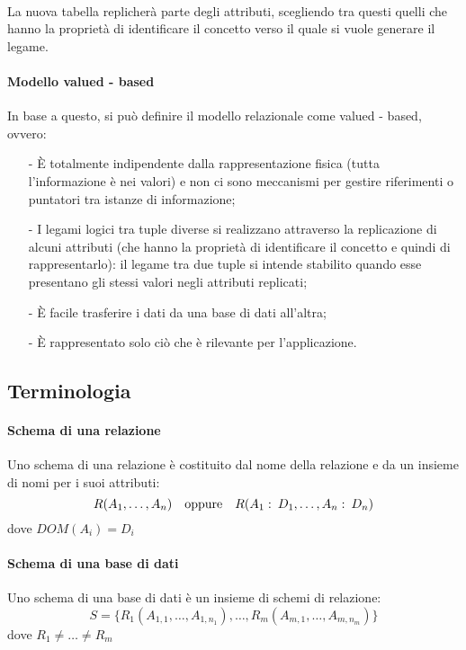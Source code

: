 \documentclass[a4paper, 10pt]{report}
\begin{document}
\noindent \\La nuova tabella replicherà
			parte degli attributi, scegliendo tra questi quelli che
			hanno la proprietà di identificare il concetto verso il
			quale si vuole generare il legame.
			
			
\paragraph*{Modello valued - based} In base a questo, si può definire il modello relazionale come valued - based, ovvero:
\begin{itemize}
			\item[-] È totalmente indipendente dalla rappresentazione fisica (tutta
			l'informazione è nei valori) e non ci sono meccanismi per
			gestire riferimenti o puntatori tra istanze di informazione;
			\item[-] I legami logici tra tuple diverse si realizzano attraverso la
			replicazione di alcuni attributi (che hanno la proprietà di
			identificare il concetto e quindi di rappresentarlo): il legame
			tra due tuple si intende stabilito quando esse presentano gli
			stessi valori negli attributi replicati;
			\item[-] È facile trasferire i dati da una base di dati all'altra;
			\item[-]  È rappresentato solo ciò che è rilevante per l'applicazione.
		\end{itemize}
			
\subsection*{Terminologia}			
		\paragraph*{Schema di una relazione} Uno schema di una relazione è costituito dal nome della
		relazione e da un insieme di nomi per i suoi attributi:
		\[
			R(A_1 , \dots, A_n ) \quad \textup{oppure} \quad R(A_1 :\:D_1 , \dots, A_n :\: D_n )
		\]
		dove $DOM(A_i ) = D_i$
		
		\paragraph*{Schema di una base di dati} Uno schema di una base di dati è un insieme di schemi di relazione:
		\[
			S = \{R_1 (A_{1,1},\dots, A_{1,n_1} ), \dots , R_m (A_{m,1} , \dots, A_{m,n_m} )\}
		\]
		dove $R_1 \neq\dots \neq R_m$
		
\end{document}
